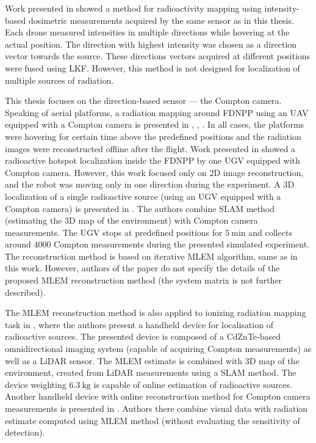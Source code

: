 Work presented in \cite{stibinger2020} showed a method for radioactivity mapping using intensity-based dosimetric measurements acquired by the same sensor as in this thesis.
Each drone measured intensities in multiple directions while hovering at the actual position.
The direction with highest intensity was chosen as a direction vector towards the source.
These directions vectors acquired at different positions were fused using \ac{LKF}.
However, this method is not designed for localization of multiple sources of radiation.

This thesis focuses on the direction-based sensor --- the Compton camera.
Speaking of aerial platforms, a radiation mapping around \ac{FDNPP} using an \ac{UAV} equipped with a Compton camera is presented in \cite{Jiang2015}, \cite{Mochizuki_2017}, \cite{sato_drone_compton_camera_2018}.
In all cases, the platforms were hovering for certain time above the predefined positions and the radiation images were reconstructed offline after the flight.
Work presented in \cite{fuku_compton} showed a radioactive hotspot localization inside the \ac{FDNPP} by one \ac{UGV} equipped with Compton camera.
However, this work focused only on 2D image reconstruction, and the robot was moving only in one direction during the experiment.
A 3D localization of a single radioactive source (using an \ac{UGV} equipped with a Compton camera) is presented in \cite{3D_compton_mobile_robot_2017}.
The authors combine \ac{SLAM} method (estimating the 3D map of the environment) with Compton camera measurements. %
The \ac{UGV} stops at predefined positions for $\SI{5}{\minute}$ and collects around $4000$ Compton measurements during the presented simulated experiment.
The reconstruction method is based on iterative \ac{MLEM} algorithm, same as in this work.
However, authors of the paper do not specify the details of the proposed \ac{MLEM} reconstruction method (the system matrix is not further described).

The \ac{MLEM} reconstruction method is also applied to ionizing radiation mapping task in \cite{handheld_mlem_reconstruction}, 
where the authors present a handheld device for localisation of radioactive sources. 
The presented device is composed of a CdZnTe-based omnidirectional imaging system (capable of acquiring Compton measurements) as well as a \ac{LiDAR} sensor.
The \ac{MLEM} estimate is combined with 3D map of the environment, created from \ac{LiDAR} measurements using a \ac{SLAM} method.
The device weighting $\SI{6.3}{\kilogram}$ is capable of online estimation of radioactive sources.
Another handheld device with online reconstruction method for Compton camera measurements is presented in \cite{handheld_visual}.
Authors there combine visual data with radiation estimate computed using \ac{MLEM} method (without evaluating the sensitivity of detection).

